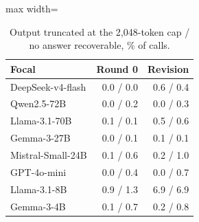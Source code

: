 \begin{table}[t]
\centering
\caption{Output truncated at the 2{,}048-token cap / no answer recoverable, \% of calls.}
\label{tab:parse}
\begin{adjustbox}{max width=\linewidth}
\small
\begin{tabular}{@{}lrr@{}}
\toprule
Focal & Round 0 & Revision \\
\midrule
DeepSeek-v4-flash & 0.0 / 0.0 & 0.6 / 0.4 \\
Qwen2.5-72B & 0.0 / 0.2 & 0.0 / 0.3 \\
Llama-3.1-70B & 0.1 / 0.1 & 0.5 / 0.6 \\
Gemma-3-27B & 0.0 / 0.1 & 0.1 / 0.1 \\
Mistral-Small-24B & 0.1 / 0.6 & 0.2 / 1.0 \\
GPT-4o-mini & 0.0 / 0.4 & 0.0 / 0.7 \\
Llama-3.1-8B & 0.9 / 1.3 & 6.9 / 6.9 \\
Gemma-3-4B & 0.1 / 0.7 & 0.2 / 0.8 \\
\bottomrule
\end{tabular}
\end{adjustbox}
\end{table}
